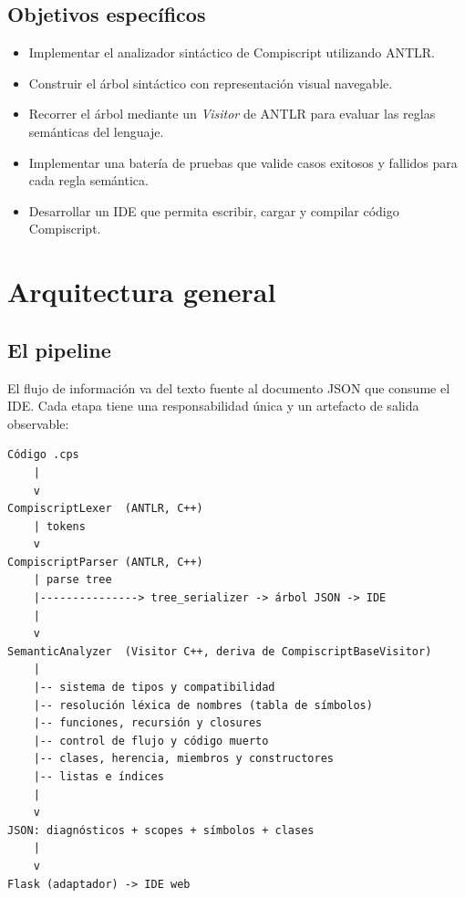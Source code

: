 \documentclass[11pt,a4paper]{article}
\begin{document}
\subsection{Objetivos específicos}

\begin{itemize}[leftmargin=1.4em]
  \item Implementar el analizador sintáctico de Compiscript utilizando ANTLR.
  \item Construir el árbol sintáctico con representación visual navegable.
  \item Recorrer el árbol mediante un \emph{Visitor} de ANTLR para evaluar las
        reglas semánticas del lenguaje.
  \item Implementar una batería de pruebas que valide casos exitosos y fallidos
        para cada regla semántica.
  \item Desarrollar un IDE que permita escribir, cargar y compilar código
        Compiscript.
\end{itemize}

\section{Arquitectura general}

\subsection{El pipeline}

El flujo de información va del texto fuente al documento JSON que consume el
IDE. Cada etapa tiene una responsabilidad única y un artefacto de salida
observable:

\begin{center}
\begin{minipage}{0.86\textwidth}
\ttfamily\small
\begin{verbatim}
Código .cps
    |
    v
CompiscriptLexer  (ANTLR, C++)
    | tokens
    v
CompiscriptParser (ANTLR, C++)
    | parse tree
    |---------------> tree_serializer -> árbol JSON -> IDE
    |
    v
SemanticAnalyzer  (Visitor C++, deriva de CompiscriptBaseVisitor)
    |
    |-- sistema de tipos y compatibilidad
    |-- resolución léxica de nombres (tabla de símbolos)
    |-- funciones, recursión y closures
    |-- control de flujo y código muerto
    |-- clases, herencia, miembros y constructores
    |-- listas e índices
    |
    v
JSON: diagnósticos + scopes + símbolos + clases
    |
    v
Flask (adaptador) -> IDE web
\end{verbatim}
\end{minipage}
\end{center}
\end{document}
